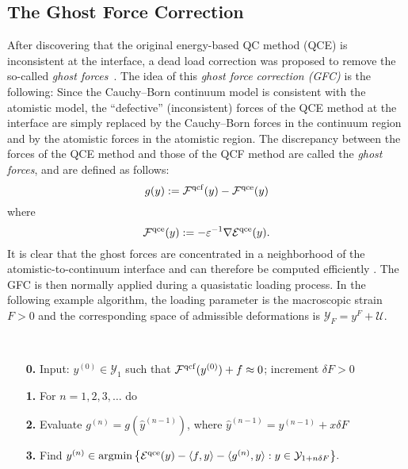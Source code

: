 \documentclass[12pt,reqno]{amsart}
\begin{document}
\subsection{The Ghost Force Correction}
\label{sec:gfc_method}
After discovering that the original energy-based QC method (QCE) is
inconsistent at the interface, a dead load correction was proposed to
remove the so-called {\em ghost forces}~\cite{Shenoy:1999a}.  The idea
of this {\em ghost force correction (GFC)} is the following: Since the
Cauchy--Born continuum model is consistent with the atomistic model,
the ``defective'' (inconsistent) forces of the QCE method at the
interface are simply replaced by the Cauchy--Born forces in the continuum
region and by the atomistic forces in the atomistic region.
The discrepancy between the forces of
the QCE method and those of the QCF method are called the {\em ghost
  forces}, and are defined as follows:
\begin{displaymath}
  g(y) := {\mathcal{F}}^{\rm qcf}(y) - {\mathcal{F}}^{\rm qce}(y)
\end{displaymath}
where
\begin{displaymath}
{\mathcal{F}}^{\rm qce}(y) := -{\varepsilon}^{-1} \nabla {\mathcal{E}}^{\rm qce}(y).
\end{displaymath}
It is clear that the ghost forces are concentrated in a neighborhood
of the atomistic-to-continuum interface and can therefore be computed
efficiently \cite{Shenoy:1999a}. The GFC is then normally applied
during a quasistatic loading process. In the following example
algorithm, the loading parameter is the macroscopic strain $F>0$ and
the corresponding space of admissible deformations is
$
{\mathcal{Y}}_F=y^F+{\mathcal{U}}.
$

\medskip {} \\[-4mm]
\begin{enumerate}
\item[{\bf 0.}] Input: $y^{(0)} \in {\mathcal{Y}}_1$ such that ${\mathcal{F}}^{\rm
    qcf}(y^{(0)}) + f \approx 0$; increment $\delta F > 0$
\item[{\bf 1.}] For $n = 1, 2, 3, \dots$ do
\item[{\bf 2.}] \qquad Evaluate $g^{(n)} = g(\hat{y}^{(n-1)})$, where
  $\hat{y}^{(n-1)} = y^{(n-1)} + x \delta F $
\item[{\bf 3.}] \qquad Find $y^{(n)} \in {{\rm argmin}} \,
  \big\{{{\mathcal{E}}^{{\rm qce}}}(y) - {\langle} f, y {\rangle} - {\langle} g^{(n)}, y {\rangle} : y \in {\mathcal{Y}}_{1 + n\delta F} \big\}.$
\end{enumerate}
\end{document}
